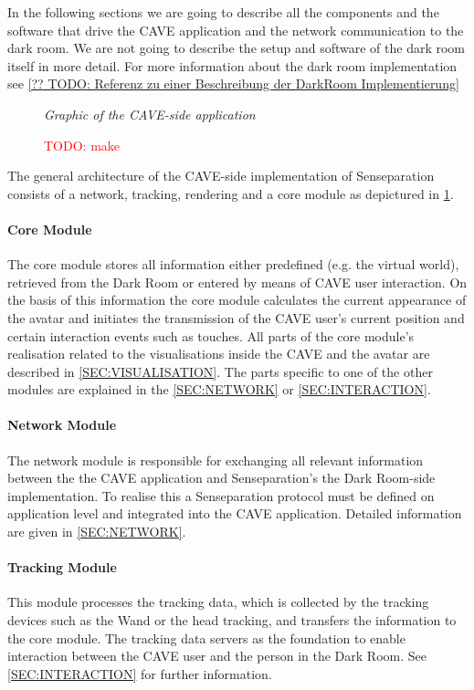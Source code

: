 \documentclass[conference]{acmsiggraph}
\newcommand{\todo}[1]{\textcolor{red}{TODO: #1}}
\begin{document}
In the following sections we are going to describe all the components and the software that drive the CAVE application and the network communication to the dark room. We are not going to describe the setup and software of the dark room itself in more detail. For more information about the dark room implementation see \ref{?? TODO: Referenz zu einer Beschreibung der DarkRoom Implementierung}

\begin{figure}[ht]
	\textit{Graphic of the CAVE-side application}
	\caption{\todo{make}}
	\label{FIG:CAVE_APP_ARCHITECTURE}
\end{figure}

The general architecture of the CAVE-side implementation of Senseparation consists of a network, tracking, rendering and a core module as depictured in \cref{FIG:CAVE_APP_ARCHITECTURE}.\par

\paragraph{Core Module}
The core module stores all information either predefined (e.g. the virtual world), retrieved from the Dark Room or entered by means of CAVE user interaction. On the basis of this information the core module calculates the current appearance of the avatar and initiates the transmission of the CAVE user's current position and certain interaction events such as touches. All parts of the core module's realisation related to the visualisations inside the CAVE and the avatar are described in \cref{SEC:VISUALISATION}. The parts specific to one of the other modules are explained in the \cref{SEC:NETWORK} or \ref{SEC:INTERACTION}.

\paragraph{Network Module}
The network module is responsible for exchanging all relevant information between the the CAVE application and Senseparation's the Dark Room-side implementation. To realise this a Senseparation protocol must be defined on application level and integrated into the CAVE application. Detailed information are given in \cref{SEC:NETWORK}.

\paragraph{Tracking Module} 
This module processes the tracking data, which is collected by the tracking devices such as the Wand or the head tracking, and transfers the information to the core module. The tracking data servers as the foundation to enable interaction between the CAVE user and the person in the Dark Room. See \cref{SEC:INTERACTION} for further information.
\end{document}
